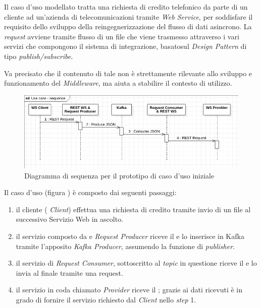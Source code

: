 Il caso d'uso modellato tratta una richiesta di credito telefonico da parte di un cliente ad un'azienda di telecomunicazioni tramite \textit{Web Service}, per soddisfare il requisito dello sviluppo della reingegnerizzazione del flusso di dati asincrono.
La \textit{request} avviene tramite flusso di un file  che viene trasmesso attraverso i vari servizi che compongono il sistema di integrazione, basatosul \textit{Design Pattern} di tipo \textit{publish/subscribe}.

Va precisato che il contenuto di tale  non è strettamente rilevante allo sviluppo e funzionamento del \textit{Middleware}, ma aiuta a stabilire il contesto di utilizzo.

\bigskip
\begin{figure}[h]
  \begin{center}
    \includegraphics[width=\textwidth, trim={0.08cm 0 0 0.08cm},clip]{images/uc_sequence.png}
    \caption{Diagramma di sequenza  per il prototipo di caso d'uso iniziale}
  \end{center}
\end{figure}

\noindent
Il caso d'uso (figura \thefigure) è composto dai seguenti passaggi:
\begin{enumerate}
  \item il cliente (\textit{ Client}) effettua una richiesta di credito tramite invio di un file  al successivo Servizio Web in ascolto.
  \item il servizio composto da   e \textit{Request Producer} riceve il  e lo inserisce in Kafka tramite l'apposito \textit{Kafka Producer}, assumendo la funzione di \textit{publisher}.
  \item il servizio di \textit{Request Consumer}, sottoscritto al \textit{topic} in questione riceve il  e lo invia al  finale tramite una  request.
  \item il servizio in coda chiamato  \textit{Provider} riceve il ; grazie ai dati ricevuti è in grado di fornire il servizio richiesto dal \textit{Client} nello \textit{step} 1.
\end{enumerate}

